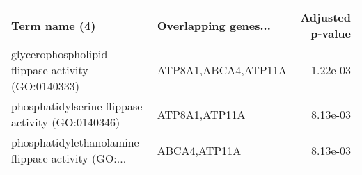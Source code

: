 \begin{tabular}{llr}
\toprule
                                     Term name (4) & Overlapping genes... &  Adjusted p-value \\
\midrule
glycerophospholipid flippase activity (GO:0140333) &  ATP8A1,ABCA4,ATP11A &          1.22e-03 \\
 phosphatidylserine flippase activity (GO:0140346) &        ATP8A1,ATP11A &          8.13e-03 \\
phosphatidylethanolamine flippase activity (GO:... &         ABCA4,ATP11A &          8.13e-03 \\
\bottomrule
\end{tabular}
